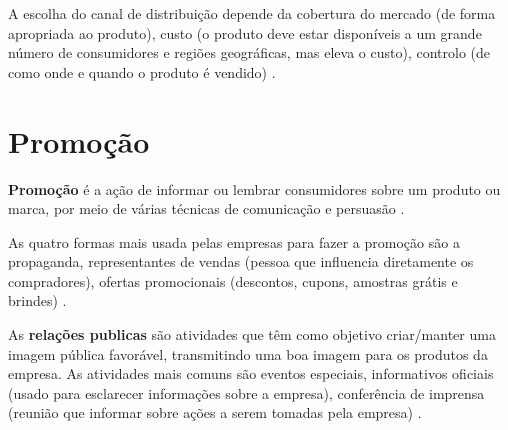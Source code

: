 A escolha do canal de distribuição depende da cobertura do mercado (de forma apropriada ao produto), custo (o produto deve estar disponíveis a um grande número de consumidores e regiões geográficas, mas eleva o custo), controlo (de como onde e quando o produto é vendido) \cite{maximiano}.

\section{Promoção}


\textbf{Promoção} é a ação de informar ou lembrar consumidores sobre um produto ou marca, por meio de várias técnicas de comunicação e persuasão \cite{maximiano}.


As quatro formas mais usada pelas empresas para fazer a promoção são a propaganda, representantes de vendas (pessoa que influencia diretamente os compradores), ofertas promocionais (descontos, cupons, amostras grátis e brindes) \cite{maximiano}.


As \textbf{relações publicas} são atividades que têm como objetivo criar/manter uma imagem pública favorável, transmitindo uma boa imagem para os produtos da empresa. As atividades mais comuns são eventos especiais, informativos oficiais (usado para esclarecer informações sobre a empresa), conferência de imprensa (reunião que informar sobre ações a serem tomadas pela empresa) \cite{maximiano}.